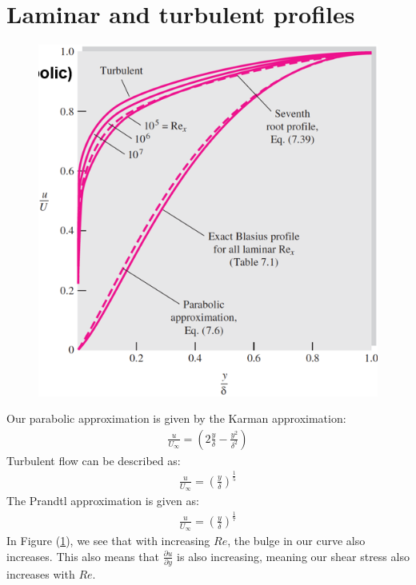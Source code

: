 \documentclass[class=report, crop=false, 12pt,a4paper]{standalone}
\begin{document}
\section{Laminar and turbulent profiles}
\begin{figure}[H]
  \centering
  \includegraphics[width = 0.8 \textwidth]{../img/diagram71.png}
  \caption{}
  \label{lamturbpfs}
\end{figure}
Our parabolic approximation is given by the Karman approximation:
\begin{align}
  \frac{u}{U_\infty} = \left( 2 \frac{y}{\delta} - \frac{y^2}{\delta^2}\right)
\end{align}
Turbulent flow can be described as:
\begin{align}
  \frac{u}{U_\infty} = \left(\frac{y}{\delta}\right)^{\frac{1}{5}}
\end{align}
The Prandtl approximation is given as:
\begin{align}
  \frac{u}{U_\infty} = \left(\frac{y}{\delta}\right)^{\frac{1}{7}}
\end{align}
In Figure (\ref{lamturbpfs}), we see that with increasing $Re$, the bulge in our curve also increases. This also means that $\frac{\partial u}{\partial y}$ is also increasing, meaning our shear stress also increases with $Re$.
\end{document}

